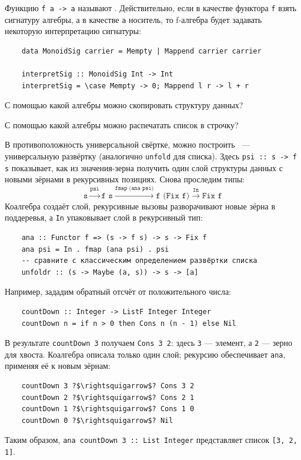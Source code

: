 Функцию \texttt{f a -> a} называют .
Действительно, если в качестве функтора \texttt{f} взять сигнатуру алгебры, а в качестве \texttt{a} носитель, то f-алгебра будет задавать некоторую интерпретацию сигнатуры:
\begin{verbatim}
    data MonoidSig carrier = Mempty | Mappend carrier carrier

    interpretSig :: MonoidSig Int -> Int
    interpretSig = \case Mempty -> 0; Mappend l r -> l + r
\end{verbatim}

\begin{task}
    С помощью какой алгебры можно скопировать структуру данных?
\end{task}

\begin{task}
    С помощью какой алгебры можно распечатать список в строчку?
\end{task}

В противоположность универсальной свёртке, можно построить ~--- универсальную развёртку (аналогично \texttt{unfold} для списка).
Здесь  \texttt{psi :: s -> f s} показывает, как из значения-зерна получить один слой структуры данных с новыми зёрнами в рекурсивных позициях.
Снова проследим типы:
\[
    \texttt{s}
    \xrightarrow{\texttt{psi}} \texttt{f s}
    \xrightarrow{\texttt{fmap (ana psi)}} \texttt{f (Fix f)}
    \xrightarrow{\texttt{In}} \texttt{Fix f}
\]
Коалгебра создаёт слой, рекурсивные вызовы разворачивают новые зёрна в поддеревья, а \texttt{In} упаковывает слой в рекурсивный тип:
\begin{verbatim}
    ana :: Functor f => (s -> f s) -> s -> Fix f
    ana psi = In . fmap (ana psi) . psi
    -- сравните с классическим определением развёртки списка
    unfoldr :: (s -> Maybe (a, s)) -> s -> [a]
\end{verbatim}

Например, зададим обратный отсчёт от положительного числа:
\begin{verbatim}
    countDown :: Integer -> ListF Integer Integer
    countDown n = if n > 0 then Cons n (n - 1) else Nil
\end{verbatim}
В результате \texttt{countDown 3} получаем \texttt{Cons 3 2}: здесь \texttt{3} --- элемент, а \texttt{2} --- зерно для хвоста.
Коалгебра описала только один слой; рекурсию обеспечивает \texttt{ana}, применяя её к новым зёрнам:
\begin{verbatim}
    countDown 3 ?$\rightsquigarrow$? Cons 3 2
    countDown 2 ?$\rightsquigarrow$? Cons 2 1
    countDown 1 ?$\rightsquigarrow$? Cons 1 0
    countDown 0 ?$\rightsquigarrow$? Nil
\end{verbatim}
Таким образом, \texttt{ana countDown 3 :: List Integer} представляет список \texttt{[3, 2, 1]}.

